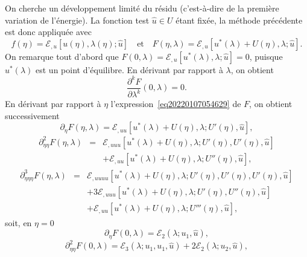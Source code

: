 \documentclass{article}
\begin{document}
On cherche un d{\'e}veloppement limit{\'e} du r{\'e}sidu (c'est-{\`a}-dire de
la premi{\`e}re variation de l'{\'e}nergie). La fonction test $\hat{u} \in U$
{\'e}tant fix{\'e}e, la m{\'e}thode pr{\'e}c{\'e}dente est donc appliqu{\'e}e
avec
\begin{equation}
  \label{eq20220107054629} f (\eta) =\mathcal{E}_{, u} [u (\eta), \lambda
  (\eta) ; \hat{u}] \quad \text{et} \quad F (\eta, \lambda) =\mathcal{E}_{, u}
  [u^{\ast} (\lambda) + U (\eta), \lambda ; \hat{u}] .
\end{equation}
On remarque tout d'abord que $F (0, \lambda) =\mathcal{E}_{, u} [u^{\ast}
(\lambda), \lambda ; \hat{u}] = 0$, puisque $u^{\ast} (\lambda)$ est un point
d'{\'e}quilibre. En d{\'e}rivant par rapport {\`a} $\lambda$, on obtient
\begin{equation}
  \label{eq20211112164240} \frac{\partial^k F}{\partial \lambda^k} (0,
  \lambda) = 0.
\end{equation}
En d{\'e}rivant par rapport {\`a} $\eta$ l'expression~\eqref{eq20220107054629}
de $F$, on obtient successivement
\begin{equation}
  \partial_{\eta} F (\eta, \lambda) =\mathcal{E}_{, u  u} [u^{\ast}
  (\lambda) + U (\eta), \lambda ; U' (\eta), \hat{u}],
\end{equation}
\begin{eqnarray}
  \partial_{\eta  \eta}^2 F (\eta, \lambda) & = & \mathcal{E}_{, u
   u  u} [u^{\ast} (\lambda) + U (\eta), \lambda ; U' (\eta),
  U' (\eta), \hat{u}] \nonumber\\
  &  &  +\mathcal{E}_{, u  u} [u^{\ast} (\lambda) + U
  (\eta), \lambda ; U'' (\eta), \hat{u}],
\end{eqnarray}
\begin{eqnarray}
  \partial_{\eta  \eta  \eta}^3 F (\eta, \lambda) & = &
  \mathcal{E}_{, u  u  u  u} [u^{\ast} (\lambda) + U
  (\eta), \lambda ; U' (\eta), U' (\eta), U' (\eta), \hat{u}] \nonumber\\
  &  &  + 3\mathcal{E}_{, u  u  u} [u^{\ast}
  (\lambda) + U (\eta), \lambda ; U' (\eta), U'' (\eta), \hat{u}] \nonumber\\
  &  &  +\mathcal{E}_{, u  u} [u^{\ast} (\lambda) + U
  (\eta), \lambda ; U''' (\eta), \hat{u}],
\end{eqnarray}
soit, en $\eta = 0$
\begin{equation}
  \partial_{\eta} F (0, \lambda) =\mathcal{E}_2 (\lambda ; u_1, \hat{u}),
\end{equation}
\begin{equation}
  \partial_{\eta  \eta}^2 F (0, \lambda) =\mathcal{E}_3 (\lambda ;
  u_1, u_1, \hat{u}) + 2\mathcal{E}_2 (\lambda ; u_2, \hat{u}),
\end{equation}
\end{document}
